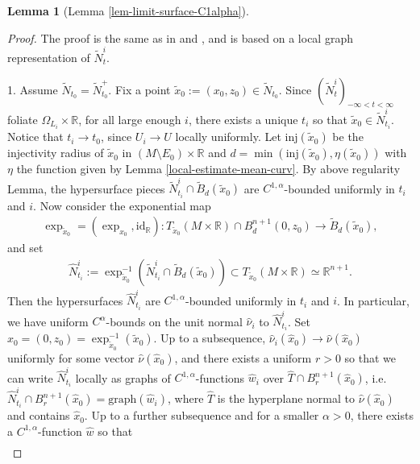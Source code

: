 \documentclass[11pt, letterpaper]{amsart}
\newtheorem{lem}[thm]{Lemma}
\theoremstyle{definition}
\theoremstyle{remark}
\begin{document}
\begin{appendix}
\begin{lem}[Lemma \ref{lem-limit-surface-C1alpha}]
\end{lem}
\begin{proof}
	The proof is the same as in \cite[Lemma 7.4]{HuiskenWolff22} and \cite[Proposition 8]{Moore12}, and is based on a local graph representation of $\tilde{N}^{i}_t$.

	1. Assume $\tilde{N}_{t_0} = \tilde{N}^{+}_{t_0}$. Fix a point $\tilde{x}_0:= (x_0, z_0) \in \tilde{N}_{t_0}$. Since $(\tilde{N}^{i}_t)_{-\infty<t<\infty}$ foliate $\Omega _{L_i} \times \mathbb{R}$, for all large enough $i$,  there exists a unique $t_i $ so that $\tilde{x}_0 \in \tilde{N}^{i}_{t_i}$. Notice that $t_i \to t_0$, since $U_i \to U$ locally uniformly. Let $\mathrm{inj} (\tilde{x}_0)$ be the injectivity radius of $\tilde{x}_0$ in $(M\setminus E_0) \times \mathbb{R}$ and $d=\min(\mathrm{inj} (\tilde{x}_0), \eta (\tilde{x}_0) )$ with $\eta $ the function given by Lemma \ref{local-estimate-mean-curv}. By above regularity Lemma, the hypersurface pieces $\tilde{N}^{i}_{t_i} \cap \tilde{B}_d(\tilde{x}_0)$ are $C^{1,\alpha }$-bounded uniformly in $t_i$ and $i$. Now consider the exponential map
	\begin{align*}
		\exp_{\tilde{x}_0}= (\exp_{x_0}, \mathrm{id}_{\mathbb{R}}): T_{\tilde{x}_0}(M \times \mathbb{R}) \cap B^{n+1}_{d}(0, z_0) \to \tilde{B}_{d}(\tilde{x}_0),
	\end{align*} 
	and set 
	\begin{align*}
		\hat{N}^{i}_{t_i} := \exp^{-1}_{\tilde{x}_0} \left( \tilde{N}^{i}_{t_i} \cap \tilde{B}_d(\tilde{x}_0) \right) \subset T_{\tilde{x}_0}(M \times \mathbb{R}) \simeq \mathbb{R}^{n+1}.
	\end{align*} 
	Then the hypersurfaces $\hat{N}^{i}_{t_i}$ are $C^{1,\alpha }$-bounded uniformly in $t_i$ and $i$. In particular, we have uniform $C^{\alpha }$-bounds on the unit normal $\hat{\nu }_i$ to  $\hat{N}^{i}_{t_i}$. Set $\hat{x}_0 = (0, z_0) = \exp ^{-1}_{\tilde{x}_0}(\tilde{x}_0)$. Up to a subsequence, $\hat{\nu }_i(\hat{x}_0) \to \hat{\nu }(\hat{x}_0)$ uniformly for some vector $\hat{\nu }(\hat{x}_0)$, and there exists a uniform $r>0$ so that we can write $\hat{N}^{i}_{t_i} $ locally as graphs of $C^{1,\alpha }$-functions $\hat{w}_i$ over $\hat{T} \cap B^{n+1}_r(\hat{x}_0)$, i.e. $\hat{N}^{i}_{t_i} \cap B^{n+1}_r(\hat{x}_0) = \mathrm{graph}(\hat{w}_i)$, where $\hat{T}$ is the hyperplane normal to $\hat{\nu }(\hat{x}_0)$ and contains $\hat{x}_0$. Up to a further subsequence and for a smaller $\alpha >0$, there exists a $C^{1,\alpha }$-function $\hat{w}$ so that
	\begin{align*}

\end{align*}
\end{proof}
\end{appendix}
\end{document}
